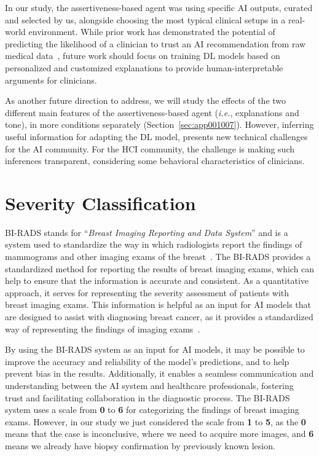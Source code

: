 In our study, the assertiveness-based agent was using specific \ac{AI} outputs, curated and selected by us, alongside choosing the most typical clinical setups in a real-world environment.
While prior work has demonstrated the potential of predicting the likelihood of a clinician to trust an \ac{AI} recommendation from raw medical data~\cite{pmlr-v97-raghu19a}, future work should focus on training \ac{DL} models based on personalized and customized explanations to provide human-interpretable arguments for clinicians.

As another future direction to address, we will study the effects of the two different main features of the assertiveness-based agent ({\it i.e.}, explanations and tone), in more conditions separately (Section~\ref{sec:app001007}).
However, inferring useful information for adapting the \ac{DL} model, presents new technical challenges for the \ac{AI} community.
For the \ac{HCI} community, the challenge is making such inferences transparent, considering some behavioral characteristics of clinicians.

\section{Severity Classification}
\label{sec:app005009}

\ac{BI-RADS} stands for ``{\it Breast Imaging Reporting and Data System}'' and is a system used to standardize the way in which radiologists report the findings of mammograms and other imaging exams of the breast~\cite{SPAK2017179, mckinney2020international}.
The \ac{BI-RADS} provides a standardized method for reporting the results of breast imaging exams, which can help to ensure that the information is accurate and consistent.
As a quantitative approach, it serves for representing the severity assessment of patients with breast imaging exams.
This information is helpful as an input for \ac{AI} models that are designed to assist with diagnosing breast cancer, as it provides a standardized way of representing the findings of imaging exams~\cite{MAICAS2019101562}.

By using the \ac{BI-RADS} system as an input for \ac{AI} models, it may be possible to improve the accuracy and reliability of the model's predictions, and to help prevent bias in the results.
Additionally, it enables a seamless communication and understanding between the \ac{AI} system and healthcare professionals, fostering trust and facilitating collaboration in the diagnostic process.
The \ac{BI-RADS} system uses a scale from {\bf 0} to {\bf 6} for categorizing the findings of breast imaging exams.
However, in our study we just considered the scale from {\bf 1} to {\bf 5}, as the {\bf 0} means that the case is inconclusive, where we need to acquire more images, and {\bf 6} means we already have biopsy confirmation by previously known lesion.

